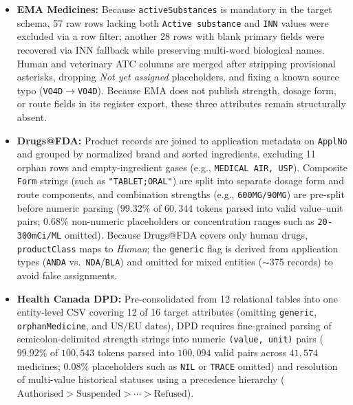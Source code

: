 \documentclass{llncs}
\begin{document}
\begin{itemize}
  \item \textbf{EMA Medicines:} Because \texttt{activeSubstances} is mandatory in the target schema, 57 raw rows lacking both \texttt{Active substance} and \texttt{INN} values were excluded via a row filter; another 28 rows with blank primary fields were recovered via INN fallback while preserving multi-word biological names. Human and veterinary ATC columns are merged after stripping provisional asterisks, dropping \textit{Not yet assigned} placeholders, and fixing a known source typo (\texttt{VO4D}$\rightarrow$\texttt{V04D}). Because EMA does not publish strength, dosage form, or route fields in its register export, these three attributes remain structurally absent.
  \item \textbf{Drugs@FDA:} Product records are joined to application metadata on \texttt{ApplNo} and grouped by normalized brand and sorted ingredients, excluding 11 orphan rows and empty-ingredient gases (e.g., \texttt{MEDICAL AIR, USP}). Composite \texttt{Form} strings (such as \texttt{"TABLET;ORAL"}) are split into separate dosage form and route components, and combination strengths (e.g., \texttt{600MG/90MG}) are pre-split before numeric parsing ($99.32\%$ of $60{,}344$ tokens parsed into valid value--unit pairs; $0.68\%$ non-numeric placeholders or concentration ranges such as \texttt{20-300mCi/ML} omitted). Because Drugs@FDA covers only human drugs, \texttt{productClass} maps to \textit{Human}; the \texttt{generic} flag is derived from application types (\texttt{ANDA} vs.\ \texttt{NDA}/\texttt{BLA}) and omitted for mixed entities ($\sim$375 records) to avoid false assignments.
  \item \textbf{Health Canada DPD:} Pre-consolidated from 12 relational tables into one entity-level CSV covering 12 of 16 target attributes (omitting \texttt{generic}, \texttt{orphanMedicine}, and US/EU dates), DPD requires fine-grained parsing of semicolon-delimited strength strings into numeric \texttt{(value, unit)} pairs ($99.92\%$ of $100{,}543$ tokens parsed into $100{,}094$ valid pairs across $41{,}574$ medicines; $0.08\%$ placeholders such as \texttt{NIL} or \texttt{TRACE} omitted) and resolution of multi-value historical statuses using a precedence hierarchy ($\text{Authorised} > \text{Suspended} > \cdots > \text{Refused}$).
\end{itemize}
\end{document}
